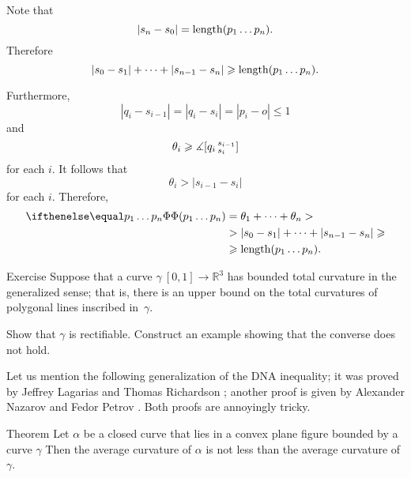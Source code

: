 Note that 
\[|s_n-s_0|=\mathop{\rm length}\nolimits (p_1\dots p_n).\]
Therefore 
\[|s_0-s_1|+\dots+|s_{n-1}-s_n|\geqslant \mathop{\rm length}\nolimits (p_1\dots p_n).\]

Furthermore,
\[|q_i-s_{i-1}|=|q_i-s_i|=|p_i-o|\le 1\]
and
\[\theta_i\geqslant\measuredangle [q_i\,{}^{s_{i-1}}_{s_i}]\]
for each $i$.
It follows that
\[\theta_i>|s_{i-1}-s_i|\]
for each $i$.
Therefore,
\begin{align*}
\tc {p_1\dots p_n}
&=\theta_1+\dots+\theta_n>
\\
&> |s_{0}-s_1|+\dots +|s_{n-1}-s_n|\ge 
\\
&\ge\length (p_1\dots p_n).
\end{align*}
\qedsf

\begin{thm}{Exercise}\label{ex:tc-rectifiable}
Suppose that a curve $\gamma\:[0,1]\to\mathbb{R}^3$ has bounded total curvature in the generalized sense;
that is, there is an upper bound on the total curvatures of polygonal lines inscribed in~$\gamma$.

Show that $\gamma$ is rectifiable.
Construct an example showing that the converse does not hold. 
\end{thm}

Let us mention the following  generalization of the DNA inequality;
it was proved by Jeffrey Lagarias and Thomas Richardson \cite{lagarias-richardso}; another proof is given by Alexander Nazarov and Fedor Petrov \cite{nazarov-petrov}.
Both proofs are annoyingly tricky.

\begin{thm}{Theorem}
Let $\alpha$ be a closed curve that lies in a convex plane figure bounded by a curve $\gamma$
Then the average curvature of $\alpha$ is not less than the average curvature of $\gamma$.

\end{thm}
